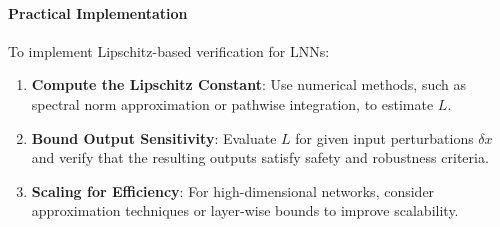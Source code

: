 \paragraph{Practical Implementation}
To implement Lipschitz-based verification for LNNs:
\begin{enumerate}
    \item \textbf{Compute the Lipschitz Constant}: Use numerical methods, such as spectral norm approximation or pathwise integration, to estimate \(L\).
    \item \textbf{Bound Output Sensitivity}: Evaluate \(L\) for given input perturbations \(\delta x\) and verify that the resulting outputs satisfy safety and robustness criteria.
    \item \textbf{Scaling for Efficiency}: For high-dimensional networks, consider approximation techniques or layer-wise bounds to improve scalability.
\end{enumerate}
